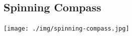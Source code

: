 \begin{multicols}{2}
%
%

\subsection{Spinning Compass}

\begin{center}
\texttt{[image: ./img/spinning-compass.jpg]}
\end{center}


\end{multicols}
